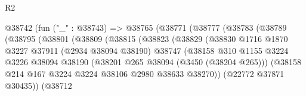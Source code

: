 \begin{lexlean}{R2}
\begin{coremodule}
                                @38742
                                  (fun ("_" : @38743) =>
                                  @38765
                                    (@38771
                                      (@38777
                                        (@38783
                                          (@38789
                                            (@38795
                                              (@38801
                                                (@38809
                                                  (@38815
                                                    (@38823
                                                      (@38829
                                                        (@38830
                                                          @1716
                                                          @1870
                                                          @3227
                                                          @37911
                                                          (@2934 @38094 @38190)
                                                          @38747
                                                          (@38158
                                                            @310
                                                            @1155
                                                            @3224
                                                            @3226
                                                            @38094
                                                            @38190
                                                            (@38201
                                                              @265
                                                              @38094
                                                              (@3450 (@38204 @265)))
                                                            (@38158
                                                              @214
                                                              @167
                                                              @3224
                                                              @3224
                                                              @38106
                                                              @2980
                                                              @38633
                                                              @38270))
                                                          (@22772 @37871 @30435))
                                                        (@38712

\end{coremodule}
\end{lexlean}
